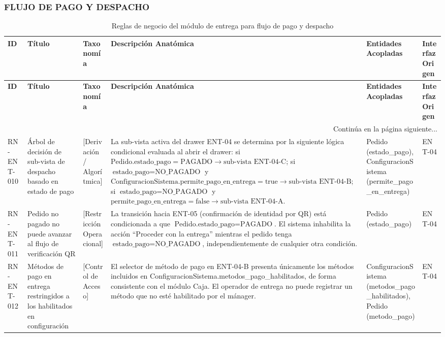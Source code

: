\begin{landscape}
\subsubsection{FLUJO DE PAGO Y DESPACHO}
\begingroup
\setlength{\LTleft}{\fill}
\setlength{\LTright}{\fill}

\begin{longtable}[c]{l p{2.1cm} p{2.1cm} p{8cm} p{4cm} p{3cm}}
\caption{Reglas de negocio del módulo de entrega para flujo de pago y despacho} \label{tab:reglas-negocio-entrega-pago-despacho}\\
\toprule
\textbf{ID} & \textbf{Título} & \textbf{Taxonomía} & \textbf{Descripción Anatómica} & \textbf{Entidades Acopladas} & \textbf{Interfaz Origen} \\
\midrule
\endfirsthead

\toprule
\textbf{ID} & \textbf{Título} & \textbf{Taxonomía} & \textbf{Descripción Anatómica} & \textbf{Entidades Acopladas} & \textbf{Interfaz Origen} \\
\midrule
\endhead

\midrule
\multicolumn{6}{r}{\small Continúa en la página siguiente...} \\
\endfoot
\bottomrule
\endlastfoot

RN-ENT-010 & Árbol de decisión de sub-vista de despacho basado en estado de pago & [Derivación / Algorítmica] & La sub-vista activa del drawer ENT-04 se determina por la siguiente lógica condicional evaluada al abrir el drawer: si $\text{Pedido.estado\_pago} = \text{PAGADO} \rightarrow \text{sub-vista ENT-04-C}$; si $\text{estado\_pago} = \text{NO\_PAGADO}$ y $\text{ConfiguracionSistema.permite\_pago\_en\_entrega} = \text{true} \rightarrow \text{sub-vista ENT-04-B}$; si $\text{estado\_pago} = \text{NO\_PAGADO}$ y $\text{permite\_pago\_en\_entrega} = \text{false} \rightarrow \text{sub-vista ENT-04-A}$. & Pedido (estado\_pago), ConfiguracionSistema (permite\_pago\_en\_entrega) & ENT-04 \\
\addlinespace
RN-ENT-011 & Pedido no pagado no puede avanzar al flujo de verificación QR & [Restricción Operacional] & La transición hacia ENT-05 (confirmación de identidad por QR) está condicionada a que $\text{Pedido.estado\_pago} = \text{PAGADO}$. El sistema inhabilita la acción ``Proceder con la entrega'' mientras el pedido tenga $\text{estado\_pago} = \text{NO\_PAGADO}$, independientemente de cualquier otra condición. & Pedido (estado\_pago) & ENT-04 \\
\addlinespace
RN-ENT-012 & Métodos de pago en entrega restringidos a los habilitados en configuración & [Control de Acceso] & El selector de método de pago en ENT-04-B presenta únicamente los métodos incluidos en ConfiguracionSistema.metodos\_pago\_habilitados, de forma consistente con el módulo Caja. El operador de entrega no puede registrar un método que no esté habilitado por el mánager. & ConfiguracionSistema (metodos\_pago\_habilitados), Pedido (metodo\_pago) & ENT-04 \\
\end{longtable}
\endgroup


\end{landscape}
